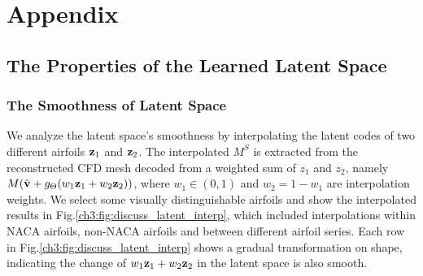 \section{Appendix}

\subsection{The Properties of the Learned Latent Space}
\label{ch3:sec:discussion}

\subsubsection{The Smoothness of Latent Space}
We analyze the latent space's smoothness by interpolating the latent codes of two different airfoils $\mathbf{z}_1$ and $\mathbf{z}_2$.
The interpolated $M^S$ is extracted from the reconstructed CFD mesh decoded from a weighted sum of $z_1$ and $z_2$, namely $M(\hat{\mathbf{v}} + g_{\Theta}(w_1\mathbf{z}_1 + w_2\mathbf{z}_2))$, where $w_1\in (0,1)$ and $w_2=1-w_1$ are interpolation weights.
We select some visually distinguishable airfoils and show the interpolated results in Fig.\ref{ch3:fig:discuss_latent_interp}, which included interpolations within NACA airfoils, non-NACA airfoils and between different airfoil series.
Each row in Fig.\ref{ch3:fig:discuss_latent_interp} shows a gradual transformation on shape, indicating the change of $w_1\mathbf{z}_1 + w_2\mathbf{z}_2$ in the latent space is also smooth.

